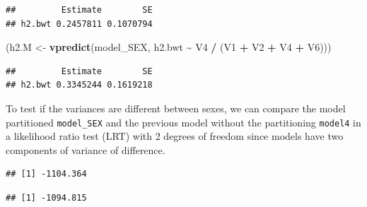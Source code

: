 \documentclass[
  12pt,
]{book}
\newenvironment{Shaded}{\begin{snugshade}}{\end{snugshade}}
\newcommand{\DecValTok}[1]{\textcolor[rgb]{0.00,0.00,0.81}{#1}}
\newcommand{\KeywordTok}[1]{\textcolor[rgb]{0.13,0.29,0.53}{\textbf{#1}}}
\newcommand{\NormalTok}[1]{#1}
\newcommand{\OperatorTok}[1]{\textcolor[rgb]{0.81,0.36,0.00}{\textbf{#1}}}
\newcommand{\StringTok}[1]{\textcolor[rgb]{0.31,0.60,0.02}{#1}}
\begin{document}
\begin{verbatim}
##         Estimate        SE
## h2.bwt 0.2457811 0.1070794
\end{verbatim}

\begin{Shaded}
\begin{Highlighting}[]
\NormalTok{(h2.M \textless{}{-}}\StringTok{ }\KeywordTok{vpredict}\NormalTok{(model\_SEX, h2.bwt }\OperatorTok{\textasciitilde{}}\StringTok{ }\NormalTok{V4 }\OperatorTok{/}\StringTok{ }\NormalTok{(V1 }\OperatorTok{+}\StringTok{ }\NormalTok{V2 }\OperatorTok{+}\StringTok{ }\NormalTok{V4 }\OperatorTok{+}\StringTok{ }\NormalTok{V6)))}
\end{Highlighting}
\end{Shaded}

\begin{verbatim}
##         Estimate        SE
## h2.bwt 0.3345244 0.1619218
\end{verbatim}

To test if the variances are different between sexes, we can compare the model partitioned \texttt{model\_SEX} and the previous model without the partitioning \texttt{model4} in a likelihood ratio test (LRT) with 2 degrees of freedom since models have two components of variance of difference.

\begin{Shaded}
\end{Shaded}

\begin{verbatim}
## [1] -1104.364
\end{verbatim}

\begin{Shaded}
\end{Shaded}

\begin{verbatim}
## [1] -1094.815
\end{verbatim}

\begin{Shaded}
\end{Shaded}
\end{document}
